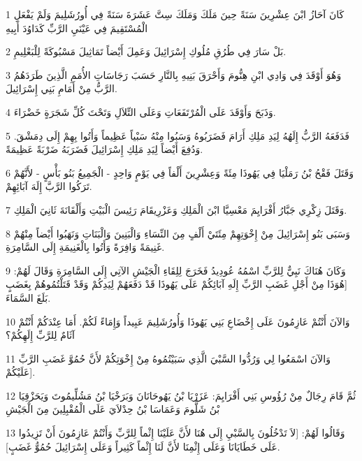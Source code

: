 \par 1 كَانَ آحَازُ ابْنَ عِشْرِينَ سَنَةً حِينَ مَلَكَ وَمَلَكَ سِتَّ عَشَرَةَ سَنَةً فِي أُورُشَلِيمَ وَلَمْ يَفْعَلِ الْمُسْتَقِيمَ فِي عَيْنَيِ الرَّبِّ كَدَاوُدَ أَبِيهِ
\par 2 بَلْ سَارَ فِي طُرُقِ مُلُوكِ إِسْرَائِيلَ وَعَمِلَ أَيْضاً تَمَاثِيلَ مَسْبُوكَةً لِلْبَعْلِيمِ.
\par 3 وَهُوَ أَوْقَدَ فِي وَادِي ابْنِ هِنُّومَ وَأَحْرَقَ بَنِيهِ بِالنَّارِ حَسَبَ رَجَاسَاتِ الأُمَمِ الَّذِينَ طَرَدَهُمُ الرَّبُّ مِنْ أَمَامِ بَنِي إِسْرَائِيلَ.
\par 4 وَذَبَحَ وَأَوْقَدَ عَلَى الْمُرْتَفَعَاتِ وَعَلَى التِّلاَلِ وَتَحْتَ كُلِّ شَجَرَةٍ خَضْرَاءَ.
\par 5 فَدَفَعَهُ الرَّبُّ إِلَهُهُ لِيَدِ مَلِكِ أَرَامَ فَضَرَبُوهُ وَسَبُوا مِنْهُ سَبْياً عَظِيماً وَأَتُوا بِهِمْ إِلَى دِمَشْقَ. وَدُفِعَ أَيْضاً لِيَدِ مَلِكِ إِسْرَائِيلَ فَضَرَبَهُ ضَرْبَةً عَظِيمَةً.
\par 6 وَقَتَلَ فَقْحُ بْنُ رَمَلْيَا فِي يَهُوذَا مِئَةً وَعِشْرِينَ أَلْفاً فِي يَوْمٍ وَاحِدٍ - الْجَمِيعُ بَنُو بَأْسٍ - لأَنَّهُمْ تَرَكُوا الرَّبَّ إِلَهَ آبَائِهِمْ.
\par 7 وَقَتَلَ زِكْرِي جَبَّارُ أَفْرَايِمَ مَعْسِيَّا ابْنَ الْمَلِكِ وَعَزْرِيقَامَ رَئِيسَ الْبَيْتِ وَأَلْقَانَةَ ثَانِيَ الْمَلِكِ.
\par 8 وَسَبَى بَنُو إِسْرَائِيلَ مِنْ إِخْوَتِهِمْ مِئَتَيْ أَلْفٍ مِنَ النِّسَاءِ وَالْبَنِينَ وَالْبَنَاتِ وَنَهَبُوا أَيْضاً مِنْهُمْ غَنِيمَةً وَافِرَةً وَأَتُوا بِالْغَنِيمَةِ إِلَى السَّامِرَةِ.
\par 9 وَكَانَ هُنَاكَ نَبِيٌّ لِلرَّبِّ اسْمُهُ عُودِيدُ فَخَرَجَ لِلِقَاءِ الْجَيْشِ الآتِي إِلَى السَّامِرَةِ وَقَالَ لَهُمْ: [هُوَذَا مِنْ أَجْلِ غَضَبِ الرَّبِّ إِلَهِ آبَائِكُمْ عَلَى يَهُوذَا قَدْ دَفَعَهُمْ لِيَدِكُمْ وَقَدْ قَتَلْتُمُوهُمْ بِغَضَبٍ بَلَغَ السَّمَاءَ.
\par 10 وَالآنَ أَنْتُمْ عَازِمُونَ عَلَى إِخْضَاعِ بَنِي يَهُوذَا وَأُورُشَلِيمَ عَبِيداً وَإِمَاءً لَكُمْ. أَمَا عِنْدَكُمْ أَنْتُمْ آثَامٌ لِلرَّبِّ إِلَهِكُمْ؟
\par 11 وَالآنَ اسْمَعُوا لِي وَرُدُّوا السَّبْيَ الَّذِي سَبَيْتُمُوهُ مِنْ إِخْوَتِكُمْ لأَنَّ حُمُوَّ غَضَبِ الرَّبِّ عَلَيْكُمْ].
\par 12 ثُمَّ قَامَ رِجَالٌ مِنْ رُؤُوسِ بَنِي أَفْرَايِمَ: عَزَرْيَا بْنُ يَهُوحَانَانَ وَبَرَخْيَا بْنُ مَشُلِّيمُوتَ وَيَحَزْقِيَا بْنُ شَلُّومَ وَعَمَاسَا بْنُ حِدْلاَيَ عَلَى الْمُقْبِلِينَ مِنَ الْجَيْشِ
\par 13 وَقَالُوا لَهُمْ: [لاَ تَدْخُلُونَ بِالسَّبْيِ إِلَى هُنَا لأَنَّ عَلَيْنَا إِثْماً لِلرَّبِّ وَأَنْتُمْ عَازِمُونَ أَنْ تَزِيدُوا عَلَى خَطَايَانَا وَعَلَى إِثْمِنَا لأَنَّ لَنَا إِثْماً كَثِيراً وَعَلَى إِسْرَائِيلَ حُمُوُّ غَضَبٍ].
